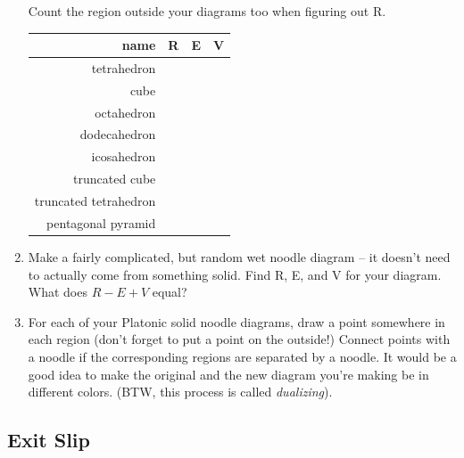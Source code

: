 \begin{enumerate}
    Count the region outside your diagrams too when figuring out R.
    \bigskip
    
    \begin{tabular}{|r|c|c|c|}
    \strut name & R & E & V \\\hline
    \bigstrut tetrahedron & & & \\ \hline
    \bigstrut cube & & & \\ \hline
    \bigstrut octahedron & & & \\ \hline
    \bigstrut dodecahedron & & & \\ \hline
    \bigstrut icosahedron & & & \\ \hline
    \bigstrut truncated cube & & & \\ \hline
    \bigstrut truncated tetrahedron & & & \\ \hline
    \bigstrut pentagonal pyramid & & & \\ \hline
    \end{tabular}
\bigskip

    \item Make a fairly complicated, but random wet noodle diagram -- it doesn't need to actually come from something solid.  Find R, E, and V for your diagram.  What does $R-E+V$ equal?
    
    \wbvfill
    
   
   \wbnewpage
   
   \item For each of your Platonic solid noodle diagrams, draw a point somewhere in each region (don't forget to put a point on the outside!)  Connect points with a noodle if the corresponding regions are separated by a noodle.  It would be a good idea to make the original and the new diagram you're making be in different colors.  (BTW, this process is called {\em dualizing}).
   
   \wbvfill
   
\end{enumerate}

\wbnewpage

\subsection{Exit Slip}

